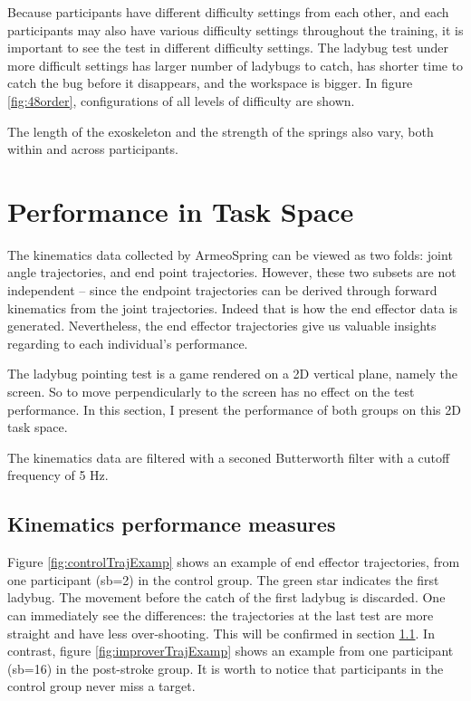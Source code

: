 Because participants have different difficulty settings from each other, and each participants may also have various difficulty settings throughout the training, it is important to see the test in different difficulty settings. The ladybug test under more difficult settings has larger number of ladybugs to catch, has shorter time to catch the bug before it disappears, and the workspace is bigger. In figure \ref{fig:48order}, configurations of all levels of difficulty are shown. 

The length of the exoskeleton and the strength of the springs also vary, both within and across participants.

\section{Performance in Task Space}

The kinematics data collected by ArmeoSpring can be viewed as two folds: joint angle trajectories, and end point trajectories. However, these two subsets are not independent -- since the endpoint trajectories can be derived through forward kinematics from the joint trajectories. Indeed that is how the end effector data is generated. Nevertheless, the end effector trajectories give us valuable insights regarding to each individual's performance.

The ladybug pointing test is a game rendered on a 2D vertical plane, namely the screen. So to move perpendicularly to the screen has no effect on the test performance. In this section, I present the performance of both groups on this 2D task space.

The kinematics data are filtered with a seconed Butterworth filter with a cutoff frequency of 5 Hz.

\subsection{Kinematics performance measures}

Figure \ref{fig:controlTrajExamp} shows an example of end effector trajectories, from one participant (sb=2) in the control group. The green star indicates the first ladybug. The movement before the catch of the first ladybug is discarded. One can immediately see the differences: the trajectories at the last test are more straight and have less over-shooting. This will be confirmed in section \ref{}. In contrast, figure \ref{fig:improverTrajExamp} shows an example from one participant (sb=16) in the post-stroke group. It is worth to notice that participants in the control group never miss a target.

